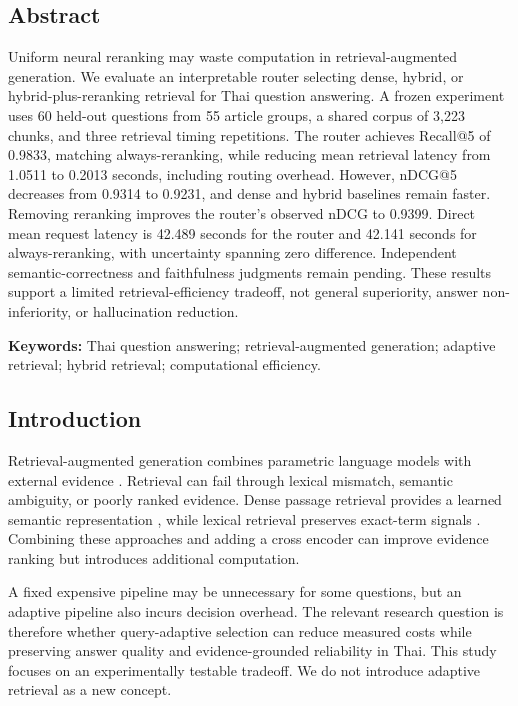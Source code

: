 \hypertarget{abstract}{%
\subsection{Abstract}\label{abstract}}

Uniform neural reranking may waste computation in retrieval-augmented
generation. We evaluate an interpretable router selecting dense, hybrid,
or hybrid-plus-reranking retrieval for Thai question answering. A frozen
experiment uses 60 held-out questions from 55 article groups, a shared
corpus of 3,223 chunks, and three retrieval timing repetitions. The
router achieves Recall@5 of 0.9833, matching always-reranking, while
reducing mean retrieval latency from 1.0511 to 0.2013 seconds, including
routing overhead. However, nDCG@5 decreases from 0.9314 to 0.9231, and
dense and hybrid baselines remain faster. Removing reranking improves
the router's observed nDCG to 0.9399. Direct mean request latency is
42.489 seconds for the router and 42.141 seconds for always-reranking,
with uncertainty spanning zero difference. Independent
semantic-correctness and faithfulness judgments remain pending. These
results support a limited retrieval-efficiency tradeoff, not general
superiority, answer non-inferiority, or hallucination reduction.

\textbf{Keywords:} Thai question answering; retrieval-augmented
generation; adaptive retrieval; hybrid retrieval; computational
efficiency.

\hypertarget{introduction}{%
\subsection{Introduction}\label{introduction}}

Retrieval-augmented generation combines parametric language models with
external evidence \citep{ref1}. Retrieval can fail through lexical
mismatch, semantic ambiguity, or poorly ranked evidence. Dense passage
retrieval provides a learned semantic representation \citep{ref2}, while
lexical retrieval preserves exact-term signals \citep{ref3}. Combining
these approaches and adding a cross encoder can improve evidence ranking
but introduces additional computation.

A fixed expensive pipeline may be unnecessary for some questions, but an
adaptive pipeline also incurs decision overhead. The relevant research
question is therefore whether query-adaptive selection can reduce
measured costs while preserving answer quality and evidence-grounded
reliability in Thai. This study focuses on an experimentally testable
tradeoff. We do not introduce adaptive retrieval as a new concept.


